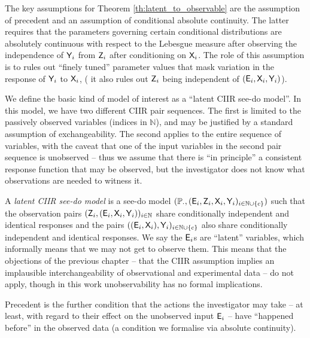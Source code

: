 The key assumptions for Theorem \ref{th:latent_to_observable} are the assumption of precedent and an assumption of conditional absolute continuity. The latter requires that the parameters governing certain conditional distributions are absolutely continuous with respect to the Lebesgue measure after observing the independence of $\mathsf{Y}_i$ from $\mathsf{Z}_i$ after conditioning on $\mathsf{X}_i$. The role of this assumption is to rules out ``finely tuned'' parameter values that mask variation in the response of $\mathsf{Y}_i$ to $\mathsf{X}_i$, ( it also rules out $\mathsf{Z}_i$ being independent of $(\mathsf{E}_i,\mathsf{X}_i,\mathsf{Y}_i)$).

We define the basic kind of model of interest as a ``latent CIIR see-do model''. In this model, we have two different CIIR pair sequences. The first is limited to the passively observed variables (indices in $\mathbb{N}$), and may be justified by a standard assumption of exchangeability. The second applies to the entire sequence of variables, with the caveat that one of the input variables in the second pair sequence is unobserved -- thus we assume that there is ``in principle'' a consistent response function that may be observed, but the investigator does not know what observations are needed to witness it.

\begin{definition}\label{def:lciirm}
A \emph{latent CIIR see-do model} is a see-do model $(\mathbb{P}_\cdot,(\mathsf{E}_i,\mathsf{Z}_{i},\mathsf{X}_i,\mathsf{Y}_i)_{i\in \mathbb{N}\cup\{c\}})$ such that the observation pairs $(\mathsf{Z}_{i},(\mathsf{E}_i,\mathsf{X}_i,\mathsf{Y}_i))_{i\in \mathbb{N}}$ share conditionally independent and identical responses and the pairs $((\mathsf{E}_i, \mathsf{X}_i),\mathsf{Y}_i)_{i\in\mathbb{N}\cup\{c\}}$ also share conditionally independent and identical responses. We say the $\mathsf{E}_i$s are ``latent'' variables, which informally means that we may not get to observe them. This means that the objections of the previous chapter -- that the CIIR assumption implies an implausible interchangeability of observational and experimental data -- do not apply, though in this work unobservability has no formal implications.
\end{definition}

Precedent is the further condition that the actions the investigator may take -- at least, with regard to their effect on the unobserved input $\mathsf{E}_i$ -- have ``happened before'' in the observed data (a condition we formalise via absolute continuity).

